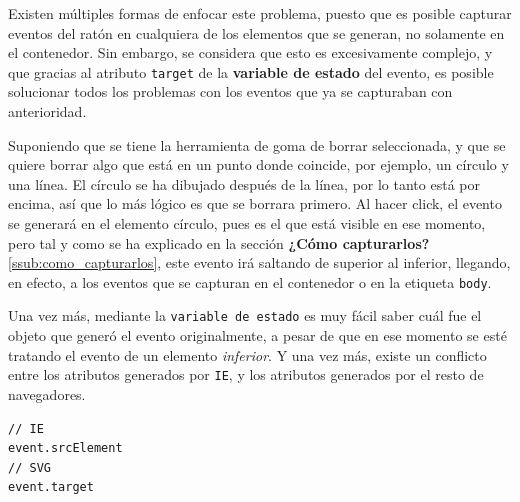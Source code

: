 Existen múltiples formas de enfocar este problema, puesto que es posible capturar eventos del ratón en cualquiera de los elementos que se generan, no solamente en el contenedor. Sin embargo, se considera que esto es excesivamente complejo, y que gracias al atributo \texttt{target} de la \textbf{variable de estado} del evento, es posible solucionar todos los problemas con los eventos que ya se capturaban con anterioridad.

Suponiendo que se tiene la herramienta de goma de borrar seleccionada, y que se quiere borrar algo que está en un punto donde coincide, por ejemplo, un círculo y una línea. El círculo se ha dibujado después de la línea, por lo tanto está por encima, así que lo más lógico es que se borrara primero. Al hacer click, el evento se generará en el elemento círculo, pues es el que está visible en ese momento, pero tal y como se ha explicado en la sección \textbf{¿Cómo capturarlos? }\ref{ssub:como_capturarlos}, este evento irá saltando de superior al inferior, llegando, en efecto, a los eventos que se capturan en el contenedor o en la etiqueta \texttt{body}.

Una vez más, mediante la \texttt{variable de estado} es muy fácil saber cuál fue el objeto que generó el evento originalmente, a pesar de que en ese momento se esté tratando el evento de un elemento \emph{inferior}. Y una vez más, existe un conflicto entre los atributos generados por \texttt{IE}, y los atributos generados por el resto de navegadores.

\begin{verbatim}
// IE
event.srcElement
// SVG
event.target
\end{verbatim}


